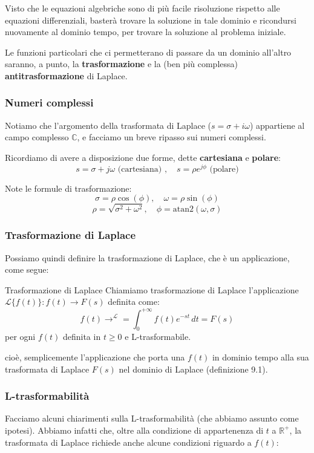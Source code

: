\documentclass[a4paper,11pt]{article}
\begin{document}
Visto che le equazioni algebriche sono di più facile risoluzione rispetto alle equazioni differenziali, basterà trovare la soluzione in tale dominio e ricondursi nuovamente al dominio tempo, per trovare la soluzione al problema iniziale.

Le funzioni particolari che ci permetterano di passare da un dominio all'altro saranno, a punto, la \textbf{trasformazione} e la (ben più complessa) \textbf{antitrasformazione} di Laplace.

\subsubsection{Numeri complessi}
Notiamo che l'argomento della trasformata di Laplace ($s = \sigma + i \omega$) appartiene al campo complesso $\mathbb{C}$, e facciamo un breve ripasso sui numeri complessi.

Ricordiamo di avere a disposizione due forme, dette \textbf{cartesiana} e \textbf{polare}:
$$
s = \sigma + j \omega \text{ (cartesiana) }, \quad s = \rho e^{j \phi} \text{ (polare)} 
$$

Note le formule di trasformazione:
$$
\sigma = \rho \cos(\phi), \quad 
\omega = \rho \sin(\phi)
$$
$$
\rho = \sqrt{\sigma^2 + \omega^2}, \quad
\phi = \mathrm{atan2}(\omega, \sigma)
$$

\subsubsection{Trasformazione di Laplace}
Possiamo quindi definire la trasformazione di Laplace, che è un applicazione, come segue:
\begin{definition}{Trasformazione di Laplace}
	Chiamiamo trasformazione di Laplace l'applicazione $\mathcal{L}\{f(t)\} : f(t) \rightarrow F(s)$ definita come:
	$$
	f(t) \rightarrow^{\mathcal{L}} = \int_{0}^{+\infty} f(t) e^{-st} \, dt = F(s)
	$$
	per ogni $f(t)$ definita in $t \geq 0$ e L-trasformabile.
\end{definition}
cioè, semplicemente l'applicazione che porta una $f(t)$ in dominio tempo alla sua trasformata di Laplace $F(s)$ nel dominio di Laplace (definizione 9.1).

\subsubsection{L-trasformabilità}
Facciamo alcuni chiarimenti sulla L-trasformabilità (che abbiamo assunto come ipotesi).
Abbiamo infatti che, oltre alla condizione di appartenenza di $t$ a $\mathbb{R}^+$, la trasformata di Laplace richiede anche alcune condizioni riguardo a $f(t)$:
\end{document}
